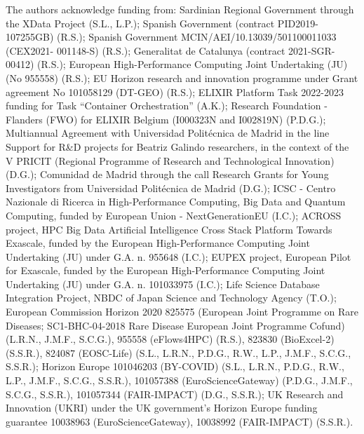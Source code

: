 \iffalse
The authors acknowledge funding from: 
  Sardinian Regional Government through the XData Project (S.L., L.P.);
  Spanish Government (contract PID2019-107255GB) (R.S.);
  Spanish Government MCIN/AEI/10.13039/501100011033 (CEX2021- 001148-S) (R.S.);
  Generalitat de Catalunya (contract 2021-SGR-00412) (R.S.);
  European High-Performance Computing Joint Undertaking (JU) (No 955558) (R.S.);
  EU Horizon research and innovation programme under Grant agreement No 101058129 (DT-GEO) (R.S.);
  ELIXIR Platform Task 2022-2023 funding for Task ``Container
  Orchestration'' (A.K.);
  Research Foundation - Flanders (FWO) for ELIXIR Belgium (I000323N and I002819N) (P.D.G.);
  Multiannual Agreement with Universidad Politécnica de Madrid in the line Support for R\&D projects for Beatriz Galindo researchers, in the context of the V PRICIT (Regional Programme of Research and Technological Innovation) (D.G.);
  Comunidad de Madrid through the call Research Grants for Young Investigators from Universidad Politécnica de Madrid (D.G.);
  ICSC - Centro Nazionale di Ricerca in High-Performance Computing, Big Data and Quantum Computing, funded by European Union - NextGenerationEU (I.C.);
  ACROSS project, HPC Big Data Artificial Intelligence Cross Stack Platform Towards Exascale, funded by the European High-Performance Computing Joint Undertaking (JU) under G.A. n. 955648 (I.C.);
  EUPEX project, European Pilot for Exascale, funded by the European High-Performance Computing Joint Undertaking (JU) under G.A. n. 101033975 (I.C.);
  Life Science Database Integration Project, NBDC of Japan Science and
  Technology Agency (T.O.);
  European Commission Horizon 2020 
  825575 (European Joint Programme on Rare Diseases; SC1-BHC-04-2018 Rare Disease European Joint Programme Cofund) (L.R.N., J.M.F., S.C.G.),
  955558 (eFlows4HPC) (R.S.),
  823830
  (BioExcel-2) (S.S.R.), 
  824087
  (EOSC-Life) (S.L., L.R.N., P.D.G., R.W., L.P., J.M.F., S.C.G., S.S.R.);
  Horizon Europe 
  101046203 (BY-COVID) (S.L., L.R.N., P.D.G., R.W., L.P., J.M.F., S.C.G., S.S.R.),
  101057388 (EuroScienceGateway) (P.D.G., J.M.F., S.C.G., S.S.R.),
  101057344 (FAIR-IMPACT) (D.G., S.S.R.);
  UK Research and Innovation (UKRI) under the UK government's Horizon
  Europe funding guarantee 
  10038963 (EuroScienceGateway), 
  10038992 (FAIR-IMPACT) (S.S.R.).

